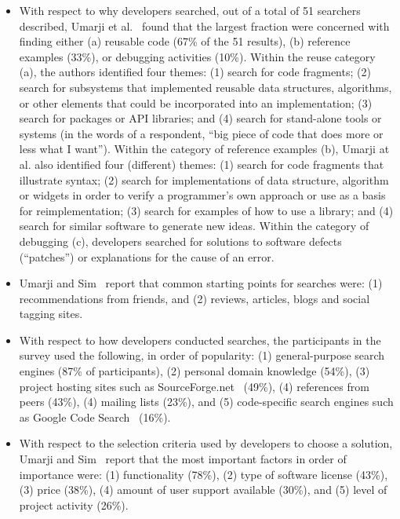\documentclass{casicswhitepaper}
\begin{document}
\begin{itemize}

\item With respect to why developers searched, out of a total of 51 searchers described, Umarji et al.~\cite{umarji_2008} found that the largest fraction were concerned with finding either (a) reusable code (67\% of the 51 results), (b) reference examples (33\%), or debugging activities (10\%).  Within the reuse category (a), the authors identified four themes: (1) search for code fragments; (2) search for subsystems that implemented reusable data structures, algorithms, or other elements that could be incorporated into an implementation; (3) search for packages or API libraries; and (4) search for stand-alone tools or systems (in the words of a respondent, ``big piece of code that does more or less what I want'').  Within the category of reference examples (b), Umarji at al. also identified four (different) themes: (1) search for code fragments that illustrate syntax; (2) search for implementations of data structure, algorithm or widgets in order to verify a programmer's own approach or use as a basis for reimplementation; (3) search for examples of how to use a library; and (4) search for similar software to generate new ideas.  Within the category of debugging (c), developers searched for solutions to software defects (``patches'') or explanations for the cause of an error.

\item Umarji and Sim~\cite{umarji_2013} report that common starting points for searches were: (1) recommendations from friends, and (2) reviews, articles, blogs and social tagging sites.

\item With respect to how developers conducted searches, the participants in the survey used the following, in order of popularity: (1) general-purpose search engines (87\% of participants), (2) personal domain knowledge (54\%), (3) project hosting sites such as SourceForge.net~\cite{} (49\%), (4) references from peers (43\%), (4) mailing lists (23\%), and (5) code-specific search engines such as Google Code Search~\cite{} (16\%).

\item With respect to the selection criteria used by developers to choose a solution, Umarji and Sim~\cite{umarji_2013} report that the most important factors in order of importance were: (1) functionality (78\%), (2) type of software license (43\%), (3) price (38\%), (4) amount of user support available (30\%), and (5) level of project activity (26\%).

\end{itemize}
\end{document}
